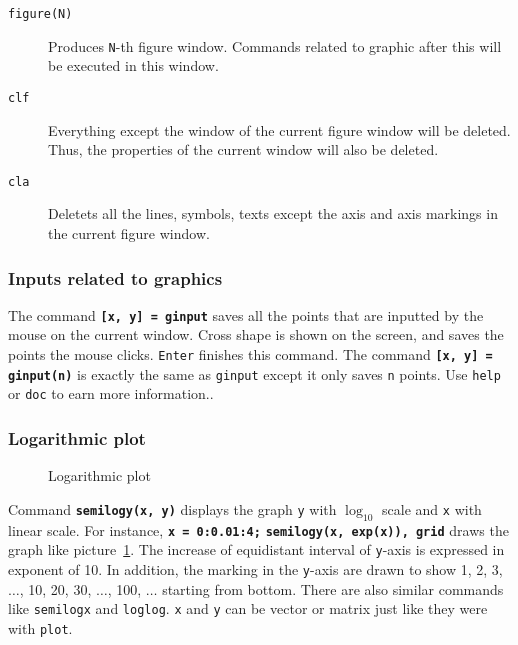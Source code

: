 \begin{description}
\item[{\tt figure(N)}] \hfil\par
Produces {\tt N}-th figure window. Commands related to graphic after this will be executed in this window.
\item[{\tt clf}] \hfil\par
Everything except the window of the current figure window will be deleted. Thus, the properties of the current window will also be deleted.
\item[{\tt cla}] \hfil\par
Deletets all the lines, symbols, texts except the axis and axis markings in the current figure window.
\end{description}

\subsubsection{Inputs related to graphics}
The command \vv \texttt{\textbf{[x, y] = ginput}} \vn saves all the points that are inputted by the mouse on the current window. Cross shape is shown on the screen, and saves the points the mouse clicks. {\tt Enter} finishes this command. The command \vv \texttt{\textbf{[x, y] = ginput(n)}} \vn is exactly the same as {\tt ginput} except it only saves {\tt n} points. Use {\tt help} or {\tt doc} to earn more information..

\subsubsection{Logarithmic plot}

\begin{figure}[]
\center {} \caption{\label{log}Logarithmic plot}
\end{figure}

Command \texttt{\textbf{semilogy(x, y)}} displays the graph {\tt y} with $\log_{10}$ scale and {\tt x} with linear scale. For instance, \matlabp\texttt{\textbf{x = 0:0.01:4;}} \matlabp\texttt{\textbf{semilogy(x, exp(x)), grid}} \vn draws the graph like picture~\ref{log}. The increase of equidistant interval of {\tt y}-axis is expressed in exponent of 10. In addition, the marking in the {\tt y}-axis are drawn to show 1, 2, 3, $\ldots$, 10, 20, 30, $\ldots$, 100, $\ldots$ starting from bottom. There are also similar commands like {\tt semilogx} and {\tt loglog}. {\tt x} and {\tt y} can be vector or matrix just like they were with {\tt plot}.

